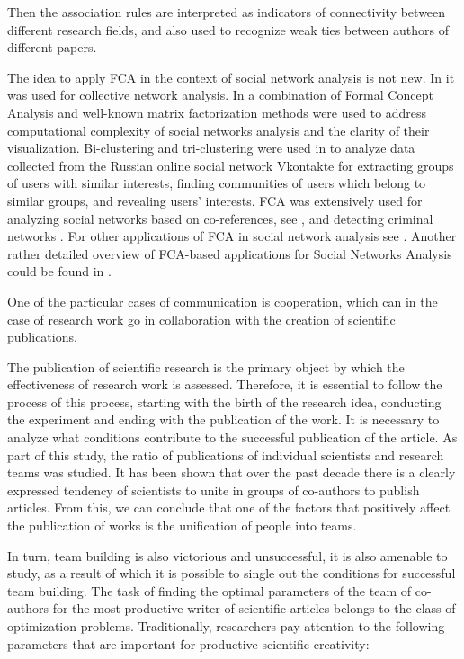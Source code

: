 \documentclass[12pt]{report}
\theoremstyle{definition}
\begin{document}
Then the association rules are interpreted as indicators of connectivity between different research fields, and also used to recognize weak ties between authors of different papers.

The idea to apply FCA in the context of social network analysis is not new. In \cite{kurtz2009collective} it was used for collective network analysis.
In \cite{snasel2009analyzing} a combination of Formal Concept Analysis and well-known matrix factorization methods were used to address computational complexity of social networks analysis and the clarity of their visualization. 
Bi-clustering and tri-clustering were used in \cite{gnatyshak2012gaining} to analyze data collected from the Russian online social network Vkontakte for extracting groups of users with similar interests, finding communities of users which belong to similar groups, and revealing users’ interests.
FCA was extensively used for analyzing social networks based on co-references, see \cite{kuznetsov2007reducing},
and detecting criminal networks \cite{poelmans2012semi}.
For other applications of FCA in social network analysis see \cite{poelmans2013formal}.
Another rather detailed overview of FCA-based applications for
Social Networks Analysis could be found in \cite{pensa2005towards,obiedkov2007social,aufaure2013advances}.


One of the particular cases of communication is cooperation, which can in the case of research work go in collaboration with the creation of scientific publications.

The publication of scientific research is the primary object by which the effectiveness of research work is assessed.
Therefore, it is essential to follow the process of this process, starting with the birth of the research idea, conducting the experiment and ending with the publication of the work.
It is necessary to analyze what conditions contribute to the successful publication of the article.
As part of this study, the ratio of publications of individual scientists and research teams was studied. 
It has been shown that over the past decade there is a clearly expressed tendency of scientists to unite in groups of co-authors to publish articles.
From this, we can conclude that one of the factors that positively affect the publication of works is the unification of people into teams.

In turn, team building is also victorious and unsuccessful, it is also amenable to study, as a result of which it is possible to single out the conditions for successful team building.
The task of finding the optimal parameters of the team of co-authors for the most productive writer of scientific articles belongs to the class of optimization problems.
Traditionally, researchers pay attention to the following parameters that are important for productive scientific creativity:
\end{document}
